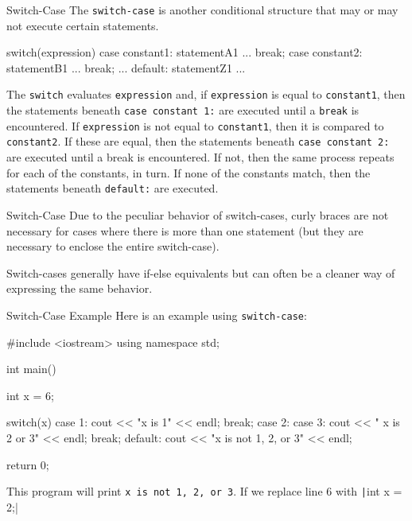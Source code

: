 \documentclass[../lecture3-flowofcontrol.tex]{subfiles}
\begin{document}
\begin{frame}[fragile]{Switch-Case}
    The \verb|switch-case| is another conditional structure that may or may not execute certain statements.

\begin{cppcode}[]
switch(expression)
{
    case constant1:
            statementA1
            ...
            break;
    case constant2:
            statementB1
            ...
            break;
    ...
    default:
            statementZ1
            ...
}
\end{cppcode}
    \begin{multicols}{2}
        The \texttt{switch} evaluates \texttt{expression} and, if \texttt{expression} is equal to \texttt{constant1}, then the statements beneath \texttt{case constant 1:} are executed until a \texttt{break} is encountered. If \texttt{expression} is not equal to \texttt{constant1}, then it is compared to \texttt{constant2}. If these are equal, then the statements beneath \texttt{case constant 2:} are executed until a break is encountered. If not, then the same process repeats for each of the constants, in turn. If none of the constants match, then the statements beneath \texttt{default:} are executed.
    \end{multicols}
\end{frame}

\begin{frame}[fragile]{Switch-Case}
    Due to the peculiar behavior of switch-cases, curly braces are not necessary for cases where there is more than one statement (but they are necessary to enclose the entire switch-case). \newline \newline

    Switch-cases generally have if-else equivalents but can often be a cleaner way of expressing the same behavior.
\end{frame}

\begin{frame}[fragile]{Switch-Case Example}
    Here is an example using \verb|switch-case|:
\begin{cppcode}[]
#include <iostream>
using namespace std;

int main()
{
    int x = 6;

    switch(x)
    {
        case 1:
            cout << "x is 1" << endl;
            break;
        case 2:
        case 3:
            cout << " x is 2 or 3" << endl;
            break;
        default:
            cout << "x is not 1, 2, or 3" << endl;
    }

    return 0;
}
\end{cppcode}

    This program will print \verb|x is not 1, 2, or 3|. If we replace line 6 with \texttt|int x = 2;|
\end{frame}

\end{document}
